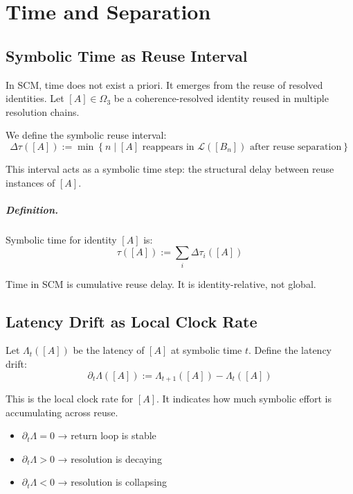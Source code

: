 \chapter{Time and Separation}

\section{Symbolic Time as Reuse Interval}

In SCM, time does not exist a priori. It emerges from the reuse of resolved identities. Let $[A] \in \Omega_3$ be a coherence-resolved identity reused in multiple resolution chains.

We define the symbolic reuse interval:
\begin{equation} \label{eq:reuse-interval}
\Delta\tau([A]) := \min \left\{ n \mid [A] \text{ reappears in } \mathcal{L}([B_n]) \text{ after reuse separation} \right\}
\end{equation}

This interval acts as a symbolic time step: the structural delay between reuse instances of $[A]$.

\paragraph{Definition.} Symbolic time for identity $[A]$ is:
\begin{equation} \label{eq:symbolic-time}
\tau([A]) := \sum_i \Delta\tau_i([A])
\end{equation}

Time in SCM is cumulative reuse delay. It is identity-relative, not global.

\section{Latency Drift as Local Clock Rate}

Let $\Lambda_t([A])$ be the latency of $[A]$ at symbolic time $t$. Define the latency drift:
\begin{equation} \label{eq:latency-drift}
\partial_t \Lambda([A]) := \Lambda_{t+1}([A]) - \Lambda_t([A])
\end{equation}

This is the local clock rate for $[A]$. It indicates how much symbolic effort is accumulating across reuse.

\begin{itemize}
    \item $\partial_t \Lambda = 0$ → return loop is stable
    \item $\partial_t \Lambda > 0$ → resolution is decaying
    \item $\partial_t \Lambda < 0$ → resolution is collapsing
\end{itemize}

